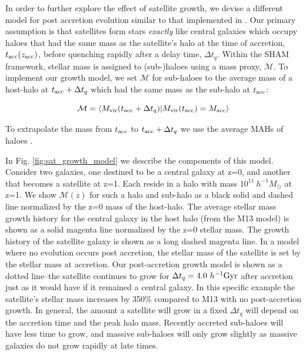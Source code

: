 \documentclass[a4paper,fleqn,usenatbib]{mnras}
\begin{document}
In order to further explore the effect of satellite growth, we devise a different model for post accretion evolution similar to that implemented in \cite{Behroozi:2015wx}.  Our primary assumption is that satellites form stars {\em exactly} like central galaxies which occupy haloes that had the same mass as the satellite's halo at the time of accretion, $t_{\rm acc}(z_{\rm acc})$, before quenching rapidly after a delay time, $\Delta t_{q}$.  Within the SHAM framework, stellar mass is assigned to (sub-)haloes using a mass proxy, $\mathcal{M}$.  To implement our growth model, we set $\mathcal{M}$ for sub-haloes to the average mass of a host-halo at $t_{\rm acc} + \Delta t_{q}$ which had the same mass as the sub-halo at $t_{\rm acc}$:
%
\begin{linenomath}
\begin{equation}
\mathcal{M} = \langle M_{\rm vir}( t_{\rm acc}+\Delta t_{q}) | M_{\rm vir}( t_{\rm acc}) = M_{\rm acc}\rangle
\end{equation}
\end{linenomath}
%
To extrapolate the mass from $t_{\rm acc}$ to $t_{\rm acc}+\Delta t_{q}$ we use the average MAHs of haloes \citep{Bosch:2014cu}.

In Fig. \ref{fig:sat_growth_model} we describe the components of this model.  Consider two galaxies, one destined to be a central galaxy at z=0, and another that becomes a satellite at z=1.  Each reside in a halo with mass $10^{11}~h^{-1}M_{\odot}$ at z=1.  We show $\mathcal{M}(z)$ for such a halo and sub-halo as a black solid and dashed line normalized by the z=0 mass of the host-halo.  The average stellar mass growth history for the central galaxy in the host halo (from the M13 model) is shown as a solid magenta line normalized by the z=0 stellar mass.  The growth history of the satellite galaxy is shown as a long dashed magenta line.  In a model where no evolution occurs post accretion, the stellar mass of the satellite is set by the stellar mass at accretion.  Our post-accretion growth model is shown as a dotted line--the satellite continues to grow for $\Delta t_q=4.0 ~ h^{-1}{\rm Gyr}$ after accretion just as it would have if it remained a central galaxy.  In this specific example the satellite's stellar mass increases by 350\% compared to M13 with no post-accretion growth.  In general, the amount a satellite will grow in a fixed $\Delta t_q$ will depend on the accretion time and the peak halo mass.  Recently accreted sub-haloes will have less time to grow, and massive sub-haloes will only grow slightly as massive galaxies do not grow rapidly at late times.  
\end{document}
